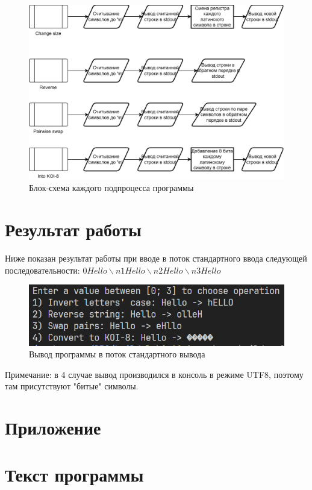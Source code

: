 \begin{figure}[h]
    \centering
    \includegraphics[width=0.75\linewidth]{images/lab1_invert_scheme.drawio.png}
    \caption{Блок-схема каждого подпроцесса программы}
    \label{fig:flowchart_other}
\end{figure}

\newpage

\section*{Результат работы}

Ниже показан результат работы при вводе в поток стандартного ввода следующей
последовательности: $0Hello\backslash n1Hello\backslash n2Hello\backslash n3Hello$

\begin{figure}[h]
    \centering
    \includegraphics[width=0.75\linewidth]{images/lab1_output.png}
    \caption{Вывод программы в поток стандартного вывода}
    \label{fig:output}
\end{figure}

Примечание: в 4 случае вывод производился в консоль в режиме UTF8, поэтому там
присутствуют "битые" символы.

\newpage

\appendix

\section*{Приложение}
\section*{Текст программы}

